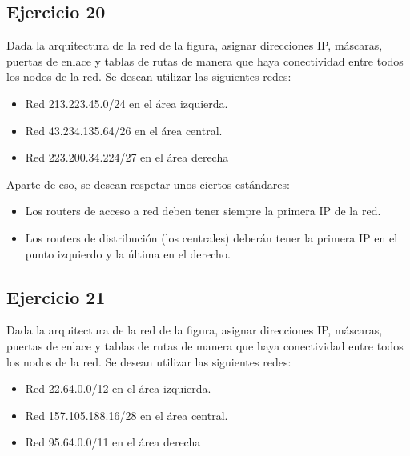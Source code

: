 \documentclass[letterpaper,10pt,spanish]{sphinxmanual}
\begin{document}
\subsection{Ejercicio 20}
\label{\detokenize{t2_integracion_elementos/ejercicios_subredes_ipv4/ejercicios_dos_router:ejercicio-20}}
\sphinxAtStartPar
Dada la arquitectura de la red de la figura, asignar direcciones IP, máscaras, puertas de enlace y tablas de rutas de manera que haya conectividad entre todos
los nodos de la red. Se desean utilizar las siguientes redes:
\begin{itemize}
\item {} 
\sphinxAtStartPar
Red 213.223.45.0/24 en el área izquierda.

\item {} 
\sphinxAtStartPar
Red 43.234.135.64/26 en el área central.

\item {} 
\sphinxAtStartPar
Red 223.200.34.224/27 en el área derecha

\end{itemize}

\begin{figure}[htbp]
\centering

\noindent{}
\end{figure}

\sphinxAtStartPar
Aparte de eso, se desean respetar unos ciertos estándares:
\begin{itemize}
\item {} 
\sphinxAtStartPar
Los routers de acceso a red deben tener siempre la primera IP de la red.

\item {} 
\sphinxAtStartPar
Los routers de distribución (los centrales) deberán tener la primera IP en el punto izquierdo y la última en el derecho.

\end{itemize}


\subsection{Ejercicio 21}
\label{\detokenize{t2_integracion_elementos/ejercicios_subredes_ipv4/ejercicios_dos_router:ejercicio-21}}
\sphinxAtStartPar
Dada la arquitectura de la red de la figura, asignar direcciones IP, máscaras, puertas de enlace y tablas de rutas de manera que haya conectividad entre todos
los nodos de la red. Se desean utilizar las siguientes redes:
\begin{itemize}
\item {} 
\sphinxAtStartPar
Red 22.64.0.0/12 en el área izquierda.

\item {} 
\sphinxAtStartPar
Red 157.105.188.16/28 en el área central.

\item {} 
\sphinxAtStartPar
Red 95.64.0.0/11 en el área derecha

\end{itemize}
\end{document}
